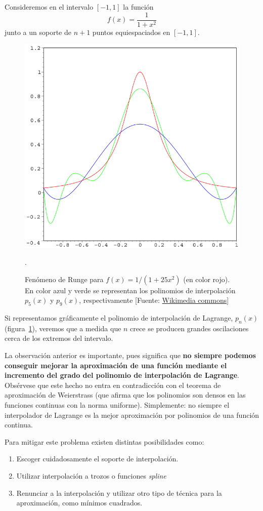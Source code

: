  \begin{example}
   \label{ex:fenomeno-runge}
   Consideremos en el intervalo $[-1,1]$ la función
   \begin{equation*}
     f(x) = \frac{1}{1+x^2}
   \end{equation*}
   junto a un soporte de $n+1$ puntos equiespaciados en $[-1,1]$. 
   \begin{figure}
     \centering
     \includegraphics[height=14\baselineskip,
     width=0.5\linewidth]{tema2/Rungesphenomenon}
     \caption{Fenómeno de Runge para $f(x)=1/(1+25x^2)$ (en color
       rojo). En color azul y verde se representan los polinomios de
       interpolación $p_5(x)$ y $p_9(x)$, respectivamente \scriptsize[Fuente:
       \href{http://commons.wikimedia.org}{Wikimedia commons}]}.
     \label{fig:fenomeno-runge}
   \end{figure}
   Si representamos gráficamente el polinomio de interpolación de
   Lagrange, $p_n(x)$ (figura~\ref{fig:fenomeno-runge}), veremos que a
   medida que $n$ crece se producen grandes oscilaciones cerca de los
   extremos del intervalo.
 \end{example}


 La observación anterior es importante, pues significa que \textbf{no siempre
   podemos conseguir mejorar la aproximación de una función mediante el
   incremento del grado del polinomio de interpolación de Lagrange}.
 Obsérvese que este hecho no entra en contradicción con el teorema de
 aproximación de Weierstrass (que afirma que los polinomios son densos
 en las funciones continuas con la norma uniforme). Simplemente: no
 siempre el interpolador de Lagrange es la mejor aproximación por
 polinomios de una función continua.

 Para mitigar este problema existen distintas posibilidades como:
 \begin{enumerate}
 \item Escoger cuidadosamente el soporte de interpolación.
 \item Utilizar interpolación a trozos o funciones \textit{spline}
 \item Renunciar a la interpolación y utilizar otro tipo de técnica
   para la aproximación, como mínimos cuadrados.
 \end{enumerate}

